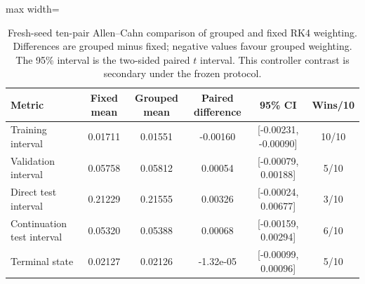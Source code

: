 \begin{table}[htbp]
\centering\scriptsize
\caption{Fresh-seed ten-pair Allen--Cahn comparison of grouped and fixed RK4 weighting. Differences are grouped minus fixed; negative values favour grouped weighting. The 95\% interval is the two-sided paired $t$ interval. This controller contrast is secondary under the frozen protocol.}
\label{tab:ac-confirmatory}
\begin{adjustbox}{max width=\linewidth}
\begin{tabular}{lccccc}
\toprule
Metric & Fixed mean & Grouped mean & Paired difference & 95\% CI & Wins/10\\
\midrule
Training interval & 0.01711 & 0.01551 & -0.00160 & [-0.00231, -0.00090] & 10/10\\
Validation interval & 0.05758 & 0.05812 & 0.00054 & [-0.00079, 0.00188] & 5/10\\
Direct test interval & 0.21229 & 0.21555 & 0.00326 & [-0.00024, 0.00677] & 3/10\\
Continuation test interval & 0.05320 & 0.05388 & 0.00068 & [-0.00159, 0.00294] & 6/10\\
Terminal state & 0.02127 & 0.02126 & -1.32e-05 & [-0.00099, 0.00096] & 5/10\\
\bottomrule
\end{tabular}
\end{adjustbox}
\end{table}
